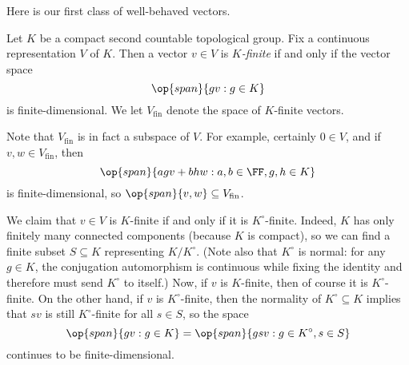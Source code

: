 \documentclass[../notes.tex]{subfiles}
\begin{document}
Here is our first class of well-behaved vectors.
\begin{definition}[finite]
	Let $K$ be a compact second countable topological group. Fix a continuous representation $V$ of $K$. Then a vector $v\in V$ is \textit{$K$-finite} if and only if the vector space
	\[\op{span}\{gv:g\in K\}\]
	is finite-dimensional. We let $V_{\mathrm{fin}}$ denote the space of $K$-finite vectors.
\end{definition}
\begin{remark}
	Note that $V_{\mathrm{fin}}$ is in fact a subspace of $V$. For example, certainly $0\in V$, and if $v,w\in V_{\mathrm{fin}}$, then
	\[\op{span}\{agv+bhw:a,b\in\FF,g,h\in K\}\]
	is finite-dimensional, so $\op{span}\{v,w\}\subseteq V_{\mathrm{fin}}$.
\end{remark}
\begin{remark} \label{rem:finite-by-connected}
	We claim that $v\in V$ is $K$-finite if and only if it is $K^\circ$-finite. Indeed, $K$ has only finitely many connected components (because $K$ is compact), so we can find a finite subset $S\subseteq K$ representing $K/K^\circ$. (Note also that $K^\circ$ is normal: for any $g\in K$, the conjugation automorphism is continuous while fixing the identity and therefore must send $K^\circ$ to itself.) Now, if $v$ is $K$-finite, then of course it is $K^\circ$-finite. On the other hand, if $v$ is $K^\circ$-finite, then the normality of $K^\circ\subseteq K$ implies that $sv$ is still $K^\circ$-finite for all $s\in S$, so the space
	\[\op{span}\{gv:g\in K\}=\op{span}\{gsv:g\in K^\circ,s\in S\}\]
	continues to be finite-dimensional.
\end{remark}
\end{document}
